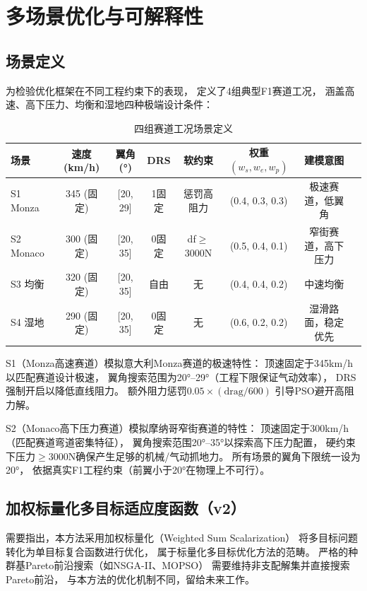 \section{多场景优化与可解释性}

\subsection{场景定义}

为检验优化框架在不同工程约束下的表现，
定义了4组典型F1赛道工况，
涵盖高速、高下压力、均衡和湿地四种极端设计条件：

\begin{table}[H]
\centering
\caption{四组赛道工况场景定义}
\begin{tabular}{lccccccl}
\toprule
场景 & 速度 (km/h) & 翼角 (°) & DRS & 软约束 & 权重$(w_s, w_e, w_p)$ & 建模意图 \\
\midrule
S1 Monza & 345 (固定) & [20, 29] & 1固定 & 惩罚高阻力 & (0.4, 0.3, 0.3) & 极速赛道，低翼角 \\
S2 Monaco & 300 (固定) & [20, 35] & 0固定 & df$\geq$3000N & (0.5, 0.4, 0.1) & 窄街赛道，高下压力 \\
S3 均衡 & 320 (固定) & [20, 35] & 自由 & 无 & (0.4, 0.4, 0.2) & 中速均衡 \\
S4 湿地 & 290 (固定) & [20, 35] & 0固定 & 无 & (0.6, 0.2, 0.2) & 湿滑路面，稳定优先 \\
\bottomrule
\end{tabular}
\end{table}

S1（Monza高速赛道）模拟意大利Monza赛道的极速特性：
顶速固定于345km/h以匹配赛道设计极速，
翼角搜索范围为20°--29°（工程下限保证气动效率），
DRS强制开启以降低直线阻力。
额外阻力惩罚$0.05 \times (\text{drag}/600)$
引导PSO避开高阻力解。

S2（Monaco高下压力赛道）模拟摩纳哥窄街赛道的特性：
顶速固定于300km/h（匹配赛道弯道密集特征），
翼角搜索范围20°--35°以探索高下压力配置，
硬约束下压力$\geq 3000$N确保产生足够的机械/气动抓地力。
所有场景的翼角下限统一设为20°，
依据真实F1工程约束（前翼小于20°在物理上不可行）。

\subsection{加权标量化多目标适应度函数（v2）}

需要指出，本方法采用加权标量化（Weighted Sum Scalarization）
将多目标问题转化为单目标复合函数进行优化，
属于标量化多目标优化方法的范畴。
严格的种群基Pareto前沿搜索（如NSGA-II、MOPSO）
需要维持非支配解集并直接搜索Pareto前沿，
与本方法的优化机制不同，留给未来工作。

